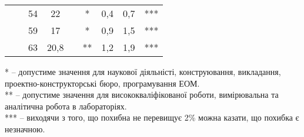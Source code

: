 \documentclass[a4paper,14pt]{extreport}
\begin{document}
\begin{landscape}
\begin{table}[h]
\begin{tabular}{|c|c|c|c|c|c|c|c|c|}
                       &                                                                               &     54      &    22        &                    &   *     &       0,4         &             0,7 &                                   ***                    \\ \cline{3-4} \cline{6-9}
                       &                                                                              &     59     &      17      &                    &      *     &    0,9            &             1,5 &                                   ***                            \\ \cline{3-4} \cline{6-9}
                       &                                                                              &     63     &      20,8      &                    &   **   &       1,2         &             1,9 &                                    ***                        \\ \hline
\end{tabular}
\end{table}
\par
*  -- допустиме значення для наукової діяльністі, конструювання, викладання, проектно-конструкторські бюро, програмування ЕОМ.\\

** -- допустиме значення для висококваліфікованої роботи, вимірювальна та аналітична робота в лабораторіях.\\

*** -- виходячи з того, що похибна не перевищує 2\% можна казати, що похибка є незначною.\\



\end{landscape}
\end{document}
